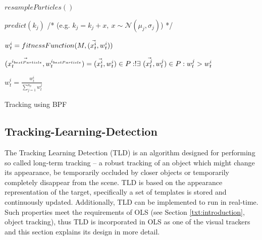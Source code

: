\begin{algorithm}
	\SetAlgoNoLine	
	\DontPrintSemicolon
	
	\BlankLine
	
	$resampleParticles()$\;
	
	\BlankLine
	{
		{		
			$predict(k_{j})$ /* (e.g. $k_{j} = k_{j} + x, ~ x \sim \mathcal{N}(\mu_{j}, \sigma_{j})$) */ \;
		}
	}
	
	\BlankLine
	{
		$w_{t}^{i} = fitnessFunction(M, (\vec{x_{t}^{i}},w_{t}^{i}))$\;
	}
	
	\BlankLine
	$(\vec{x_{t}^{i_{bestParticle}}},w_{t}^{i_{bestParticle}}) = (\vec{x_{t}^{i}},w_{t}^{i}) \in P : !\exists ~ (\vec{x_{t}^{j}},w_{t}^{j}) \in P : w_{t}^{j} > w_{t}^{i}$\;
	
	\BlankLine	
	{
		$w_{t}^{i} = \frac{w_{t}^{i}}{\sum_{j = 1}^{n_{p}}w_{t}^{j}}$
	}
	
	
	\caption{Tracking using BPF}
	\label{alg:bpf}
\end{algorithm}

\subsection{Tracking-Learning-Detection} \label{txt:tracking_learning_detection}

The Tracking Learning Detection (TLD) \cite{Kalal:2012:TRA:2225045.2225082} is an algorithm designed for performing so called long-term tracking -- a robust tracking of an object which might change its appearance, be temporarily occluded by closer objects or temporarily completely disappear from the scene. TLD is based on the appearance representation of the target, specifically a set of templates is stored and continuously updated. Additionally, TLD can be implemented to run in real-time. Such properties meet the requirements of OLS (see Section \ref{txt:introduction}, object tracking), thus TLD is incorporated in OLS as one of the visual trackers and this section explains its design in more detail.

